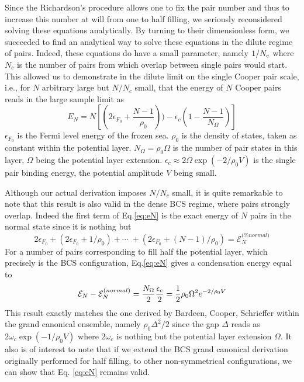 \documentclass[aps,prb,superscriptaddress,twocolumn]{revtex4}
\begin{document}
Since the Richardson's procedure allows one to fix the pair number and thus to increase this number at will from one to half filling, we seriously reconsidered solving these equations analytically. By turning to their dimensionless form, we succeeded to
find an analytical way to solve these equations in the dilute regime of
pairs. Indeed, these equations do have a small parameter, namely $1/{%
N_{c}}$ where $N_{c}$ is the number of pairs from which overlap between single pairs would start. This allowed us to demonstrate in the dilute limit on
the single Cooper pair scale, i.e., for $N$ arbitrary large but $N/N_{c}$ small, that the energy of $%
N$ Cooper pairs reads in the large sample limit as 
\begin{equation}
E_{N}=N\left[ \left( 2\epsilon _{F_{0}}+\frac{N-1}{\rho _{0}}%
\right) )-\epsilon _{c}\left( 1-\frac{N-1}{N_{\Omega }}\right) \right]
\label{eq:eN}
\end{equation}%
$\epsilon _{F_{0}}$ is the Fermi level energy of the frozen sea. 
 $\rho
_{0} $ is the density of states, taken as constant within the potential
layer. $N_{\Omega }=\rho _{0}\Omega $ is the number of pair states in this
layer, $\Omega $ being the potential layer extension. $\epsilon _{c}\approx
2\Omega \exp \left( -2/\rho _{0}V\right) $ is the single pair binding
energy, the potential amplitude $V$ being small.

Although our actual derivation imposes $N/N_{c}$ small, it is quite
remarkable to note that this result is also valid in the dense BCS regime,
where pairs strongly overlap. Indeed the first term of Eq.\eqref{eq:eN} is
the exact energy of $N$ pairs in the normal state since it is nothing but 
\begin{equation}
2\epsilon _{F_{0}}+\left( 2\epsilon _{F_{0}}+1/\rho _{0}\right) +\cdots
\;+\left( 2\epsilon _{F_{0}}+(N-1)/\rho _{0}\right) =\mathcal{E}_{N}^{\text{(%
}normal)}
\end{equation}%
For a number of pairs corresponding to fill half the potential layer, which precisely is the BCS configuration, Eq.\eqref{eq:eN} gives a condensation
energy equal to 
\begin{equation}
\mathcal{E}_{N}-\mathcal{E}_{N}^{\text{(}normal)}=\frac{N_{\Omega }}{2}\frac{%
\epsilon _{c}}{2}=\frac{1}{2}\rho _{0}\Omega ^{2}e^{-2/\rho _{0}V}
\end{equation}%
This result exactly matches the one derived by Bardeen, Cooper, Schrieffer within the grand canonical
ensemble, namely $\rho _{0}\Delta ^{2}/2$ since the gap $\Delta $ reads as $%
2\omega _{c}\exp \left( -1/\rho _{0}V\right) $ where $2\omega _{c}$ is nothing but the
potential layer extension $\Omega $. It also is of interest to note that if we extend the BCS grand canonical derivation originally performed for half filling, to other
non-symmetrical configurations,
 we can show that Eq.%
\eqref{eq:eN} remains valid.
\end{document}
